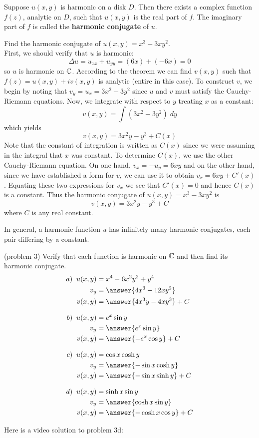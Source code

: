 \documentclass[handout]{ximera}
\begin{document}
  
\begin{theorem}
Suppose $u(x,y)$ is harmonic on a disk $D$.  Then there exists a complex function $f(z)$, analytic on $D$, 
such that $u(x,y)$ is the real part of $f$. The imaginary part of $f$ is called the {\bf harmonic conjugate} of $u$.
\end{theorem}


\begin{example}[example 3]
Find the harmonic conjugate of $u(x,y) = x^3 - 3xy^2$.\\
First, we should verify that $u$ is harmonic:
\[
\Delta u = u_{xx} + u_{yy} = (6x) + (-6x) = 0
\]
so $u$ is harmonic on $\mathbb C$. According to the theorem we can find $v(x,y)$ such that
$f(z) = u(x,y) + iv(x,y)$ is analytic (entire in this case). To construct $v$, we begin by noting that
$v_y = u_x = 3x^2 - 3y^2$ since $u$ and $v$ must satisfy the Cauchy-Riemann equations.
Now, we integrate with respect to $y$ treating $x$ as a constant:
\[
v(x,y) = \int \left(3x^2 -3y^2\right) \; dy
\]
which yields
\[
v(x,y) = 3x^2y - y^3 + C(x)
\]
Note that the constant of integration is written as $C(x)$ since we were assuming in 
the integral that $x$ was constant. To determine $C(x)$, we use the other Cauchy-Riemann equation. 
On one hand, $v_x = -u_y = 6xy$ and on the other hand, since we have established a form for $v$, we can use it
to obtain $v_x = 6xy + C'(x)$. Equating these two expressions for $v_x$ we see 
that $C'(x) =0$ and hence $C(x)$ is a constant. Thus the harmonic conjugate of $u(x,y) = x^3 - 3xy^2$ is
\[
v(x,y) = 3x^2y - y^3 + C
\]
where $C$ is any real constant.
\end{example}

\begin{remark}
In general, a harmonic function $u$ has infinitely many harmonic conjugates, each pair differing by a constant.
\end{remark}

\begin{problem}(problem 3)
Verify that each function is harmonic on $\mathbb C$ and then find its harmonic conjugate.
\begin{align*}
a) \;\;u(x,y) &= x^4 -6x^2y^2 + y^4\\
v_y &= \answer{4x^3 - 12xy^2}\\
v(x,y) &= \answer{4x^3y - 4xy^3}+C\\[8pt]
b) \;\;u(x,y) &= e^x\sin y\\
v_y &= \answer{e^x \sin y}\\
v(x,y) &= \answer{-e^x \cos y}+C\\[8pt]
c) \;\;u(x,y) &= \cos x \cosh y\\
v_y &= \answer{-\sin x \cosh y}\\
v(x,y) &= \answer{-\sin x \sinh y}+C\\[8pt]
d) \;\; u(x,y) &= \sinh x \sin y\\
v_y &= \answer{\cosh x \sin y}\\
v(x,y) &= \answer{-\cosh x \cos y}+C
\end{align*}
\end{problem}

Here is a video solution to problem 3d:\\
\begin{foldable}
\end{foldable}
\end{document}

